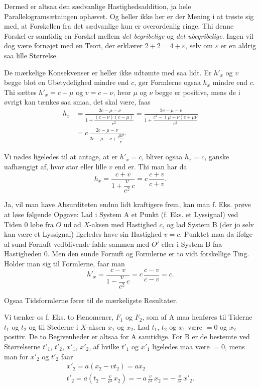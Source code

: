 \documentclass[12pt,a4paper]{article}
\newcommand{\opage}[1]{\marginnote{\footnotesize\textit{[#1]}}}
\begin{document}
Dermed er altsaa den sædvanlige Hastighedsaddition, ja hele
Parallelogramsætningen ophævet. Og heller ikke her er der Mening i at trøste
sig med, at Forskellen fra det sædvanlige kun er overordenlig ringe. Thi denne
Forskel er samtidig en Forskel mellem \emph{det begribelige} og \emph{det
ubegribelige}. Ingen vil dog være fornøjet med en Teori, der erklærer
$2 + 2 = 4 + \varepsilon$, selv om $\varepsilon$ er en aldrig saa lille
Størrelse.

De mærkelige Konsekvenser er heller ikke udtømte med saa lidt. Er $h'_{x}$ og
$v$ begge blot en Ubetydelighed mindre end $c$, gør Formlerne ogsaa $h_{x}$
mindre end $c$. Thi sættes $h'_{x} = c - \mu$ og $v = c - \nu$, hvor $\mu$ og
$\nu$ begge er positive, mens de i øvrigt kan tænkes saa smaa, det skal være,
faas
\begin{align*}
  h_{x} &= \frac{2c - \mu - \nu}{1 + \dfrac{(c - \nu)(c - \mu)}{c^{2}}}
         = \frac{2c - \mu - \nu}{1
           + \dfrac{c^{2} - (\mu + \nu)c + \mu\nu}{c^{2}}}\\
        &= c\,\frac{2c - \mu - \nu}{2c - \mu - \nu + \dfrac{\mu\nu}{c}}.
\end{align*}

Vi nødes ligeledes til at antage, at er $h'_{x} = c$, bliver ogsaa $h_{x} = c$,
ganske uafhængigt af, hvor stor eller lille $v$ end er. Thi man har da
\[
  h_{x} = \frac{c + v}{1 + \dfrac{v}{c^{2}}\,c} = c\,\frac{c + v}{c + v}.
\]

Ja, vil man have Absurditeten endnu lidt kraftigere frem, kan man f. Eks. prøve
at løse følgende Opgave: Lad i System A et Punkt (f. Eks. et Lyssignal) ved
Tiden 0 løbe fra $O$ ud ad $X$-aksen med Hastighed $c$, og lad System B (der jo
selv kan være et Lyssignal) ligeledes have sin Hastighed $v = c$. Punktet maa
da ifølge al sund
\opage{26} Fornuft vedblivende falde sammen med $O'$ eller i System B faa Hastigheden 0.
Men den sunde Fornuft og Formlerne er to vidt forskellige Ting. Holder man sig
til Formlerne, faar man
\[
  h'_{x} = \frac{c - v}{1 - \dfrac{v}{c^{2}}\,c} = c\,\frac{c - v}{c - v} = c.
\]

Ogsaa Tidsformlerne fører til de mærkeligste Resultater.

Vi tænker os f. Eks. to Fænomener, $F_{1}$ og $F_{2}$, som af A maa henføres
til Tiderne $t_{1}$ og $t_{2}$ og til Stederne i $X$-aksen $x_{1}$ og $x_{2}$.
Lad $t_{1}$, $t_{2}$ og $x_{1}$ være $= 0$ og $x_{2}$ positiv. De to
Begivenheder er altsaa for A samtidige. For B er de bestemte ved Størrelserne
$t'_{1}$, $t'_{2}$, $x'_{1}$, $x'_{2}$, af hvilke $t'_{1}$ og $x'_{1}$
ligeledes maa være $= 0$, mens man for $x'_{2}$ og $t'_{2}$ faar
\begin{gather*}
  x'_{2} = a(x_{2} - vt_{2}) = ax_{2}\\
  t'_{2} = a\left(t_{2} - \frac{v}{c^{2}}\,x_{2}\right)
         = -\,a\,\frac{v}{c^{2}}\,x_{2}
         = -\,\frac{v}{c^{2}}\,x'_{2}.
\end{gather*}
\end{document}
